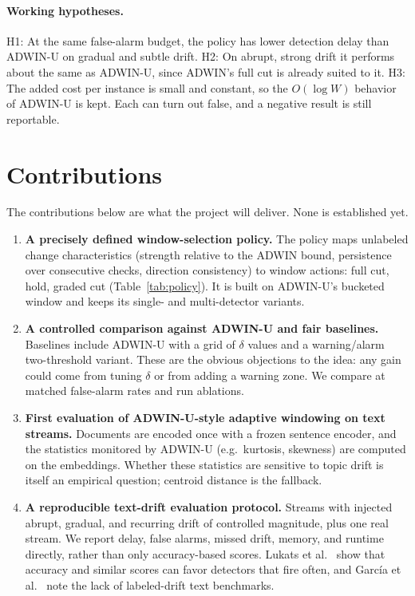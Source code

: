 \documentclass[11pt,a4paper]{article}
\begin{document}
\paragraph{Working hypotheses.}
H1: At the same false-alarm budget, the policy has lower detection delay than ADWIN-U on gradual and subtle drift. H2: On abrupt, strong drift it performs about the same as ADWIN-U, since ADWIN's full cut is already suited to it. H3: The added cost per instance is small and constant, so the $O(\log W)$ behavior of ADWIN-U is kept. Each can turn out false, and a negative result is still reportable.

\section{Contributions}

The contributions below are what the project will deliver. None is established yet.

\begin{enumerate}[label=\textbf{C\arabic*.}]
\item \textbf{A precisely defined window-selection policy.} The policy maps unlabeled change characteristics (strength relative to the ADWIN bound, persistence over consecutive checks, direction consistency) to window actions: full cut, hold, graded cut (Table~\ref{tab:policy}). It is built on ADWIN-U's bucketed window and keeps its single- and multi-detector variants.
\item \textbf{A controlled comparison against ADWIN-U and fair baselines.} Baselines include ADWIN-U with a grid of $\delta$ values and a warning/alarm two-threshold variant. These are the obvious objections to the idea: any gain could come from tuning $\delta$ or from adding a warning zone. We compare at matched false-alarm rates and run ablations.
\item \textbf{First evaluation of ADWIN-U-style adaptive windowing on text streams.} Documents are encoded once with a frozen sentence encoder, and the statistics monitored by ADWIN-U (e.g.\ kurtosis, skewness) are computed on the embeddings. Whether these statistics are sensitive to topic drift is itself an empirical question; centroid distance is the fallback.
\item \textbf{A reproducible text-drift evaluation protocol.} Streams with injected abrupt, gradual, and recurring drift of controlled magnitude, plus one real stream. We report delay, false alarms, missed drift, memory, and runtime directly, rather than only accuracy-based scores. Lukats et al.\ \cite{lukats2025} show that accuracy and similar scores can favor detectors that fire often, and García et al.\ \cite{garcia2024review} note the lack of labeled-drift text benchmarks.
\end{enumerate}
\end{document}
